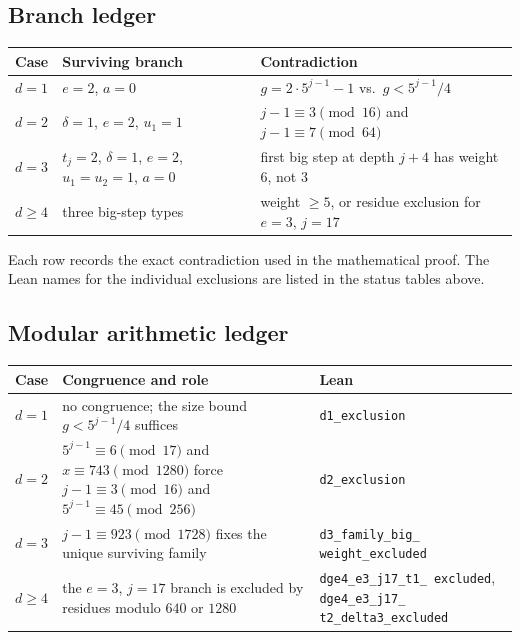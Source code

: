 \subsection{Branch ledger}

\begin{center}
\small
\begin{tabular}{@{}p{}p{}p{}@{}}
\toprule
Case & Surviving branch & Contradiction \\
\midrule
$d=1$ & $e=2$, $a=0$ &
  $g=2\cdot5^{j-1}-1$ vs.\ $g<5^{j-1}/4$ \\
$d=2$ & $\delta=1$, $e=2$, $u_1=1$ &
  $j-1\equiv3\pmod{16}$ and $j-1\equiv7\pmod{64}$ \\
$d=3$ & $t_j=2$, $\delta=1$, $e=2$, $u_1=u_2=1$, $a=0$ &
  first big step at depth $j+4$ has weight $6$, not $3$ \\[2pt]
$d\ge4$ & three big-step types &
  weight $\ge5$, or residue exclusion for $e=3$, $j=17$ \\
\bottomrule
\end{tabular}
\end{center}

Each row records the exact contradiction used in the mathematical
proof.  The Lean names for the individual exclusions are listed in
the status tables above.

\subsection{Modular arithmetic ledger}

\begin{center}
\small
\begin{tabular}{@{}p{}p{}p{}@{}}
\toprule
Case & Congruence and role & Lean \\
\midrule
$d=1$ & no congruence; the size bound $g<5^{j-1}/4$ suffices &
  \texttt{d1\_\allowbreak exclusion} \\
$d=2$ & $5^{j-1}\equiv6\pmod{17}$ and $x\equiv743\pmod{1280}$ force
  $j-1\equiv3\pmod{16}$ and $5^{j-1}\equiv45\pmod{256}$ &
  \texttt{d2\_\allowbreak exclusion} \\
$d=3$ & $j-1\equiv923\pmod{1728}$ fixes the unique surviving family &
  \texttt{d3\_\allowbreak family\_\allowbreak big\_\allowbreak
  weight\_\allowbreak excluded} \\
$d\ge4$ & the $e=3$, $j=17$ branch is excluded by residues modulo
  $640$ or $1280$ &
  \texttt{dge4\_\allowbreak e3\_\allowbreak j17\_\allowbreak t1\_\allowbreak
  excluded}, \texttt{dge4\_\allowbreak e3\_\allowbreak j17\_\allowbreak
  t2\_\allowbreak delta3\_\allowbreak excluded} \\
\bottomrule
\end{tabular}
\end{center}

